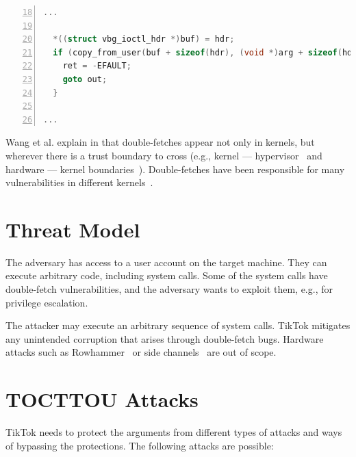 \documentclass[conference]{IEEEtran}
\newcommand{\sysname}{TikTok}
\begin{document}
\begin{lstlisting}[language=C, caption=CVE-2018-12633 Double Fetch Fix,
  label=code:cvedoublefetchfix,  breaklines=true
  postbreak=\mbox{\textcolor{red}{$\hookrightarrow$}\space},
  numbers=left,basicstyle=\scriptsize, firstnumber=18, xleftmargin=5.0ex]
...

  *((struct vbg_ioctl_hdr *)buf) = hdr;
  if (copy_from_user(buf + sizeof(hdr), (void *)arg + sizeof(hdr), hdr.size_in - sizeof(hdr))) {
    ret = -EFAULT;
    goto out;
  }

...

\end{lstlisting}

Wang et al. explain in \cite{wang2018survey} that double-fetches appear not only
in kernels, but wherever there is a trust boundary to cross (e.g., kernel ---
hypervisor~\cite{wilhelm2016xenpwn} and hardware --- kernel
boundaries~\cite{lu2018untrusted}). Double-fetches have been responsible for many
vulnerabilities in different kernels~\cite{jurczyk2013bochspwn, wang2018survey}.


\section{Threat Model}
\label{sec:threatmodel}
The adversary has access to a user account on the target machine. They can
execute arbitrary code, including system calls. Some of the system calls
have double-fetch vulnerabilities, and the adversary wants to exploit them,
e.g., for privilege escalation.

The attacker may execute an arbitrary sequence of system calls. \sysname{}
mitigates any unintended corruption that arises through double-fetch bugs.
Hardware attacks such as Rowhammer~\cite{TODO} or side channels~\cite{TODO} are
out of scope.

\section{TOCTTOU Attacks}

\sysname{} needs to protect the arguments from different types of attacks and ways of
bypassing the protections. The following attacks are possible:
\end{document}

